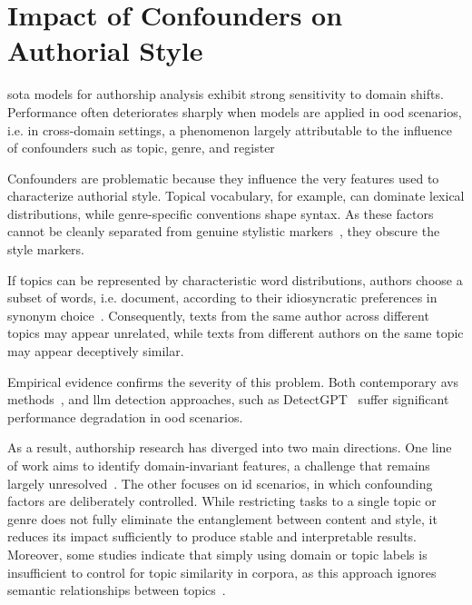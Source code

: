 \section{Impact of Confounders on Authorial Style}
\label{sec:contextual_factors}

\Acl{sota} models for authorship analysis exhibit strong sensitivity to domain shifts. 
Performance often deteriorates sharply when models are applied in \ac{ood} scenarios, i.e. in cross-domain settings, a phenomenon largely attributable to the influence of confounders such as topic, genre, and register~\citep{Sundararajan_style_18,bischoff_importance_2020}

Confounders are problematic because they influence the very features used to characterize authorial style. 
Topical vocabulary, for example, can dominate lexical distributions, while genre-specific conventions shape syntax. 
As these factors cannot be cleanly separated from genuine stylistic markers~\citep{bischoff_importance_2020}, they obscure the style markers.

If topics can be represented by characteristic word distributions, authors choose a subset of words, i.e. document, according to their idiosyncratic preferences in synonym choice~\citep{altakrori_topic_2021}. 
Consequently, texts from the same author across different topics may appear unrelated, while texts from different authors on the same topic may appear deceptively similar.

Empirical evidence confirms the severity of this problem.
Both contemporary \acp{av} methods~\citep{Thomas_cross_topic_24}, and \ac{llm} detection approaches, such as DetectGPT~\citep{mitchell_detectgpt_2023,Wu_ODD_challenges_2025} suffer significant performance degradation in \ac{ood} scenarios.

As a result, authorship research has diverged into two main directions. 
One line of work aims to identify domain-invariant features, a challenge that remains largely unresolved~\citep{bischoff_importance_2020}. 
The other focuses on \ac{id} scenarios, in which confounding factors are deliberately controlled. 
While restricting tasks to a single topic or genre does not fully eliminate the entanglement between content and style, it reduces its impact sufficiently to produce stable and interpretable results. 
Moreover, some studies indicate that simply using domain or topic labels is insufficient to control for topic similarity in corpora, as this approach ignores semantic relationships between topics~\citep{sawatphol_cross-topic_av_24}.
